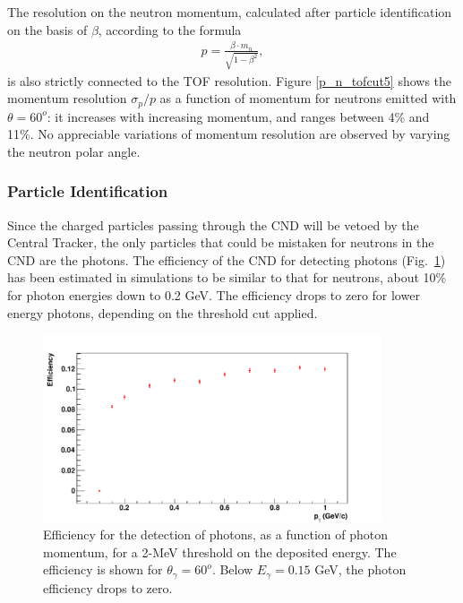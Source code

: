 The resolution on the neutron momentum, calculated after particle identification on the basis of $\beta$, according to the formula
\begin{eqnarray}
p = \frac{\beta\cdot m_n}{\sqrt{1-\beta^2}},
\end{eqnarray}
is also strictly connected to the TOF resolution. Figure \ref{p_n_tofcut5} shows the momentum resolution $\sigma_p/p$ as a function of momentum for neutrons emitted with $\theta=60^o$: it increases with increasing momentum, and ranges between 4\% and 11\%. No appreciable variations of momentum resolution are observed by varying the neutron polar angle.


\subsubsection{Particle Identification}\label{pid-section}

Since the charged particles passing through the CND will be vetoed by the Central Tracker, the only particles that could be mistaken for neutrons in the CND are the photons. 
The efficiency of the CND for detecting photons (Fig.~\ref{eff_photons}) has been estimated in simulations to be similar to that for neutrons, about 10\% for photon energies down to 0.2 GeV.  The efficiency drops to zero for lower energy photons, depending on the threshold cut applied. 

\begin{figure}  
\begin{center}
\includegraphics[width=100mm]{efficiency_photons_60deg_new.pdf}
\caption [Photon detection efficiency as a function of photon momentum]
{Efficiency for the detection of photons, as a function of photon momentum, for a 2-MeV threshold on the deposited energy. The efficiency is shown for $\theta_{\gamma}=60^o$. Below $E_\gamma=0.15$ GeV, the photon efficiency drops to zero.}
\label{eff_photons}
\end{center}
\end{figure}


